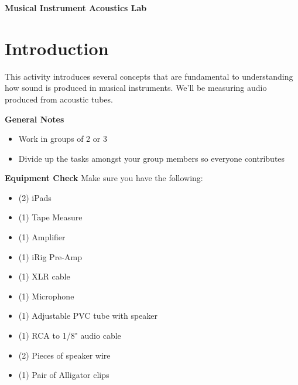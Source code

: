 \documentclass[12pt]{article}
\begin{document}
\begin{center}
{\Large \bf Musical Instrument Acoustics Lab}\\
\end{center}

\vspace{0.2in}


\vspace{.2in}

\section{Introduction}
This activity introduces several concepts that are fundamental to understanding how sound is produced in musical instruments. We'll be measuring audio produced from acoustic tubes.

\textbf{General Notes}

\begin{itemize}
\item Work in groups of 2 or 3 
\item Divide up the tasks amongst your group members so everyone contributes
\end{itemize}

\textbf{Equipment Check} Make sure you have the following:

\begin{multicols}{2}
\begin{itemize}
\item (2) iPads
\item (1) Tape Measure
\item (1) Amplifier
\item (1) iRig Pre-Amp
\item (1) XLR cable
\item (1) Microphone
\item (1) Adjustable PVC tube with speaker
\item (1) RCA to 1/8" audio cable
\item (2) Pieces of speaker wire
\item (1) Pair of Alligator clips
\end{itemize}
\end{multicols}
% 
% 
\end{document}
